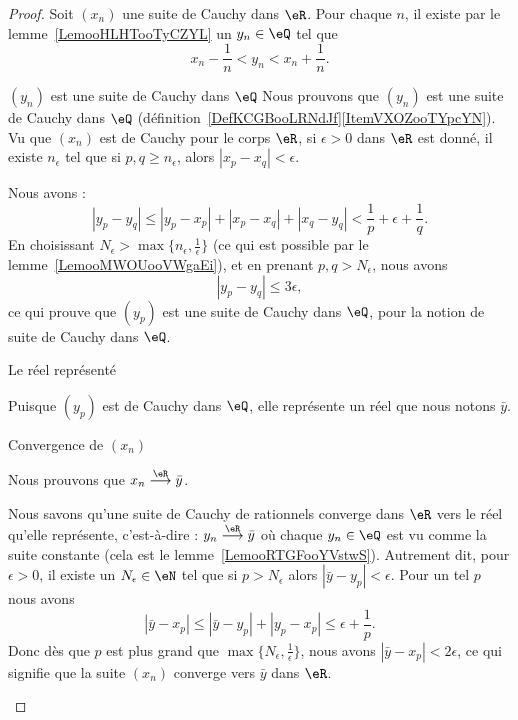 \begin{proof}
	Soit \( (x_n)\) une suite de Cauchy dans \( \eR\). Pour chaque \( n\), il existe par le lemme~\ref{LemooHLHTooTyCZYL} un \( y_n\in \eQ\) tel que
	\begin{equation}
		x_n-\frac{1}{ n }<y_n<x_n+\frac{1}{ n }.
	\end{equation}
	\begin{subproof}
		\item[\( (y_n)\) est une suite de Cauchy dans \( \eQ\)]
		Nous prouvons que \( (y_n)\) est une suite de Cauchy dans \( \eQ\) (définition~\ref{DefKCGBooLRNdJf}\ref{ItemVXOZooTYpcYN}). Vu que \( (x_n)\) est de Cauchy pour le corps \( \eR\), si \( \epsilon>0\) dans \( \eR\) est donné, il existe \( n_{\epsilon}\) tel que si \( p,q\geq n_{\epsilon}\), alors \( | x_p-x_q |<\epsilon\).

		Nous avons :
		\begin{equation}
			| y_p-y_q |\leq | y_p-x_p |+| x_p-x_q |+| x_q-y_q |<\frac{1}{ p }+\epsilon+\frac{1}{ q }.
		\end{equation}
		En choisissant \( N_{\epsilon}>\max\{ n_{\epsilon},\frac{1}{ \epsilon } \}\) (ce qui est possible par le lemme~\ref{LemooMWOUooVWgaEi}), et en prenant \( p,q>N_{\epsilon}\), nous avons
		\begin{equation}
			| y_p-y_q |\leq 3\epsilon,
		\end{equation}
		ce qui prouve que \( (y_p)\) est une suite de Cauchy dans \( \eQ\), pour la notion de suite de Cauchy dans \( \eQ\).

		\item[Le réel représenté]

		Puisque \( (y_p)\) est de Cauchy dans \( \eQ\), elle représente un réel que nous notons \( \bar y\).

		\item[Convergence de \( (x_n)\)]

		Nous prouvons que \(     x_n\stackrel{\eR}{\longrightarrow}\bar y \).

		Nous savons qu'une suite de Cauchy de rationnels converge dans \( \eR\) vers le réel qu'elle représente, c'est-à-dire : \( y_n\stackrel{\eR}{\longrightarrow}\bar y\) où chaque \( y_n\in \eQ\) est vu comme la suite constante (cela est le lemme~\ref{LemooRTGFooYVstwS}). Autrement dit, pour \( \epsilon>0\), il existe un \( N_{\epsilon}\in \eN\) tel que si \( p>N_{\epsilon}\) alors \( | \bar y-y_p |<\epsilon\). Pour un tel \( p\) nous avons
		\begin{equation}
			| \bar y-x_p |\leq| \bar y-y_p |+| y_p-x_p |\leq \epsilon+\frac{1}{ p }.
		\end{equation}
		Donc dès que \( p\) est plus grand que \( \max\{ N_{\epsilon},\frac{1}{ \epsilon } \}\), nous avons \( | \bar y-x_p |<2\epsilon\), ce qui signifie que la suite \( (x_n) \) converge vers \( \bar y\) dans \( \eR\).


\end{subproof}
\end{proof}
